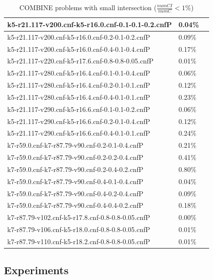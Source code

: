 \documentclass[12pt,a4paper,twoside]{scrartcl}
\numberwithin{equation}{section}
\begin{document}
\begin{table}[H]
\begin{center}
\begin{tabular}{|l|l|p{1cm}|}
 k5-r21.117-v200.cnf-k5-r16.0.cnf-0.1-0.1-0.2.cnfP&	0.04\%	\\   \hline
 k5-r21.117-v200.cnf-k5-r16.0.cnf-0.2-0.1-0.2.cnfP&	0.09\%	\\   \hline
 k5-r21.117-v200.cnf-k5-r16.0.cnf-0.4-0.1-0.4.cnfP&	0.17\%	\\   \hline
 k5-r21.117-v220.cnf-k5-r17.6.cnf-0.8-0.8-0.05.cnfP&	0.01\%	\\   \hline
 k5-r21.117-v280.cnf-k5-r16.4.cnf-0.1-0.1-0.4.cnfP&	0.06\%	\\   \hline
 k5-r21.117-v280.cnf-k5-r16.4.cnf-0.2-0.1-0.1.cnfP&	0.12\%	\\   \hline
 k5-r21.117-v280.cnf-k5-r16.4.cnf-0.4-0.1-0.1.cnfP&	0.23\%	\\   \hline
 k5-r21.117-v290.cnf-k5-r16.6.cnf-0.1-0.1-0.2.cnfP&	0.06\%	\\   \hline
 k5-r21.117-v290.cnf-k5-r16.6.cnf-0.2-0.1-0.4.cnfP&	0.12\%	\\   \hline
 k5-r21.117-v290.cnf-k5-r16.6.cnf-0.4-0.1-0.1.cnfP&	0.24\%	\\   \hline
 k7-r59.0.cnf-k7-r87.79-v90.cnf-0.2-0.1-0.4.cnfP&	0.21\%	\\   \hline
 k7-r59.0.cnf-k7-r87.79-v90.cnf-0.2-0.2-0.4.cnfP&	0.41\%	\\   \hline
 k7-r59.0.cnf-k7-r87.79-v90.cnf-0.2-0.4-0.2.cnfP&	0.80\%	\\   \hline
 k7-r59.0.cnf-k7-r87.79-v90.cnf-0.4-0.1-0.4.cnfP&	0.04\%	\\   \hline
 k7-r59.0.cnf-k7-r87.79-v90.cnf-0.4-0.2-0.4.cnfP&	0.09\%	\\   \hline
 k7-r59.0.cnf-k7-r87.79-v90.cnf-0.4-0.4-0.2.cnfP&	0.18\%	\\   \hline
 k7-r87.79-v102.cnf-k5-r17.8.cnf-0.8-0.8-0.05.cnfP&	0.00\%	\\   \hline
 k7-r87.79-v106.cnf-k5-r18.0.cnf-0.8-0.8-0.05.cnfP&	0.01\%	\\   \hline
 k7-r87.79-v110.cnf-k5-r18.2.cnf-0.8-0.8-0.05.cnfP&	0.01\%	\\   \hline

\end{tabular}
\caption{COMBINE problems with small intersection ($\frac{numCI}{numC} < 1\%$)}
\end{center}
\end{table} 

\subsection{Experiments}
\end{document}
